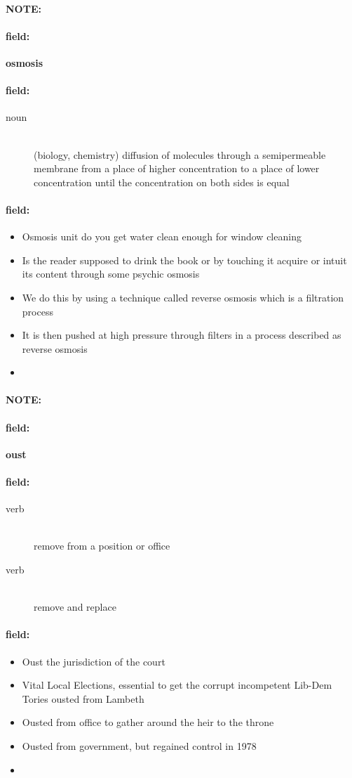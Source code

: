 \documentclass[12pt]{article}
\newenvironment{note}{\paragraph{NOTE:}}{}
\newenvironment{field}{\paragraph{field:}}{}
\begin{document}
\begin{note}
\begin{field}
\textbf{\large osmosis}
\end{field}


\begin{field}
\begin{description}
\item[noun] \hfill \\ 
(biology, chemistry) diffusion of molecules through a semipermeable membrane from a place of higher concentration to a place of lower concentration until the concentration on both sides is equal

\end{description}
\end{field}

\begin{field}
\begin{itemize}
\item Osmosis unit do you get water clean enough for window cleaning
\item Is the reader supposed to drink the book or by touching it acquire or intuit its content through some psychic osmosis
\item We do this by using a technique called reverse osmosis which is a filtration process
\item It is then pushed at high pressure through filters in a process described as reverse osmosis
\item 
\end{itemize}
\end{field}
\end{note}
\begin{note}
\begin{field}
\textbf{\large oust}
\end{field}


\begin{field}
\begin{description}
\item[verb] \hfill \\ 
remove from a position or office

\item[verb] \hfill \\ 
remove and replace

\end{description}
\end{field}

\begin{field}
\begin{itemize}
\item Oust the jurisdiction of the court
\item Vital Local Elections, essential to get the corrupt incompetent Lib-Dem Tories ousted from Lambeth
\item Ousted from office to gather around the heir to the throne
\item Ousted from government, but regained control in 1978
\item 
\end{itemize}
\end{field}
\end{note}
\end{document}
